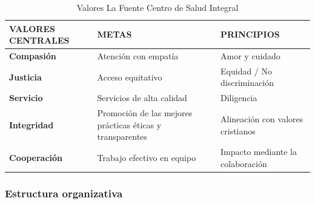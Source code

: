 \begin{table}[H]
    \caption{Valores La Fuente Centro de Salud Integral}
    \begin{tabular}{p{2.65cm} p{5.5cm} p{6cm} } %
        \hline
        \textbf{VALORES CENTRALES} & \textbf{METAS} & \textbf{PRINCIPIOS} \\
        \hline
        \textbf{Compasión} & Atención con empatía & Amor y cuidado \\
        \hline
        \textbf{Justicia} & Acceso equitativo & Equidad / No discriminación \\
        \hline
        \textbf{Servicio} & Servicios de alta calidad & Diligencia \\
        \hline
        \textbf{Integridad} & Promoción de las mejores prácticas éticas y transparentes & Alineación con valores cristianos \\
        \hline
        \textbf{Cooperación} & Trabajo efectivo en equipo & Impacto mediante la colaboración \\
        \hline
    \end{tabular}
\end{table}

\subsubsection{Estructura organizativa}

